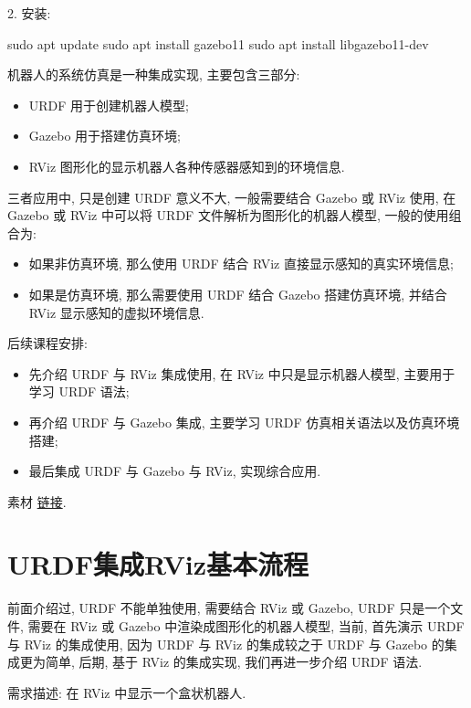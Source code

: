 \documentclass[openany, fontset=windowsold]{ctexbook}
\theoremstyle{kaiti}
\theoremstyle{normal}
\begin{document}
2. 安装: 

\begin{bash}
  sudo apt update
  sudo apt install gazebo11 
  sudo apt install libgazebo11-dev
\end{bash}

机器人的系统仿真是一种集成实现, 主要包含三部分:

\begin{itemize}
  \item URDF 用于创建机器人模型;
  \item Gazebo 用于搭建仿真环境;
  \item RViz 图形化的显示机器人各种传感器感知到的环境信息.
\end{itemize}

三者应用中, 只是创建 URDF 意义不大, 一般需要结合 Gazebo 或 RViz 使用, 在 Gazebo 或 RViz 中可以将 URDF 文件解析为图形化的机器人模型, 一般的使用组合为:

\begin{itemize}
  \item 如果非仿真环境, 那么使用 URDF 结合 RViz 直接显示感知的真实环境信息;
  \item 如果是仿真环境, 那么需要使用 URDF 结合 Gazebo 搭建仿真环境, 并结合 RViz 显示感知的虚拟环境信息.
\end{itemize}

后续课程安排:

\begin{itemize}
  \item 先介绍 URDF 与 RViz 集成使用, 在 RViz 中只是显示机器人模型, 主要用于学习 URDF 语法;
  \item 再介绍 URDF 与 Gazebo 集成, 主要学习 URDF 仿真相关语法以及仿真环境搭建;
  \item 最后集成 URDF 与 Gazebo 与 RViz, 实现综合应用.
\end{itemize}

素材 \href{https://github.com/zx595306686/sim_demo.git}{链接}.

\section{URDF集成RViz基本流程}

前面介绍过, URDF 不能单独使用, 需要结合 RViz 或 Gazebo, URDF 只是一个文件, 需要在 RViz 或 Gazebo 中渲染成图形化的机器人模型, 当前, 首先演示 URDF 与 RViz 的集成使用, 因为 URDF 与 RViz 的集成较之于 URDF 与 Gazebo 的集成更为简单, 后期, 基于 RViz 的集成实现, 我们再进一步介绍 URDF 语法.

需求描述: 在 RViz 中显示一个盒状机器人.
\end{document}
